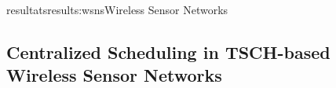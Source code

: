 \documentclass{ra2016}
\begin{document}
\begin{module}{resultats}{results:wsns}{Wireless Sensor Networks}
%
%



\subsection{Centralized Scheduling in TSCH-based Wireless Sensor Networks}


\end{module}
\end{document}
